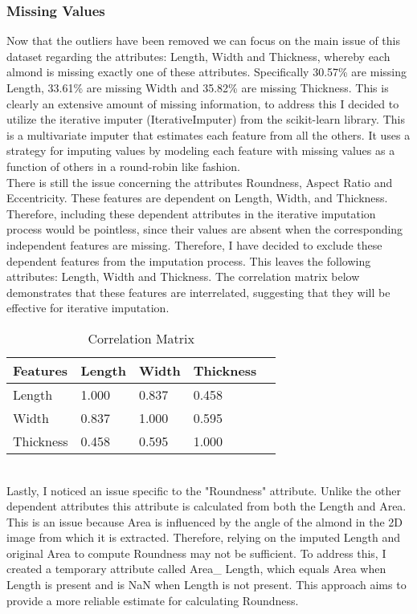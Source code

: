 \documentclass[conference]{IEEEtran}
\begin{document}
\subsubsection{Missing Values}
Now that the outliers have been removed we can focus on the main issue of this dataset regarding the attributes: Length, Width and Thickness, whereby each almond is missing exactly one of these attributes. Specifically 30.57\% are missing Length, 33.61\% are missing Width and 35.82\% are missing Thickness. This is clearly an extensive amount of missing information, to address this I decided to utilize the iterative imputer (IterativeImputer) from the scikit-learn library. This is a multivariate imputer that estimates each feature from all the others. It uses a strategy for imputing values by modeling each feature with missing values as a function of others in a round-robin like fashion.
\newline \\
There is still the issue concerning the attributes Roundness, Aspect Ratio and Eccentricity. These features are dependent on Length, Width, and Thickness. Therefore, including these dependent attributes in the iterative imputation process would be pointless, since their values are absent when the corresponding independent features are missing. Therefore, I have decided to exclude these dependent features from the imputation process. This leaves the following attributes: Length, Width and Thickness. The correlation matrix below demonstrates that these features are interrelated, suggesting that they will be effective for iterative imputation.
\begin{table}[h]
    \centering
    \caption{Correlation Matrix}
    \small
    \begin{tabular}{|p{1.5cm}|p{1cm}|p{1cm}|p{1.5cm}|p{1cm}|}
        \hline
        \textbf{Features} & \textbf{Length} & \textbf{Width} & \textbf{Thickness} \\
        \hline
        Length    & 1.000 & 0.837 & 0.458\\
        \hline
        Width     & 0.837 & 1.000 & 0.595\\
        \hline
        Thickness & 0.458 & 0.595 & 1.000\\
        \hline
    \end{tabular}
    \label{tab:correlation_matrix}
\end{table}
\newline \\
Lastly, I noticed an issue specific to the "Roundness" attribute. Unlike the other dependent attributes this attribute is calculated from both the Length and Area. This is an issue because Area is influenced by the angle of the almond in the 2D image from which it is extracted. Therefore, relying on the imputed Length and original Area to compute Roundness may not be sufficient. To address this, I created a temporary attribute called Area\_ Length, which equals Area when Length is present and is NaN when Length is not present. This approach aims to provide a more reliable estimate for calculating Roundness.
\end{document}

